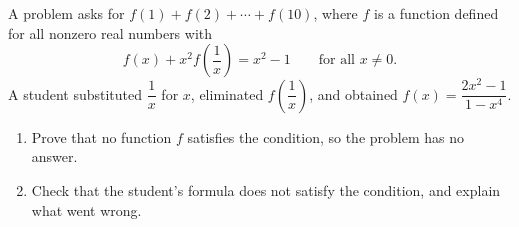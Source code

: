 A problem asks for $f(1)+f(2)+\cdots+f(10)$, where $f$ is a function defined for all nonzero real numbers with
\[
f(x)+x^2f\left(\dfrac{1}{x}\right)=x^2-1\qquad\text{for all }x\ne0 .
\]
A student substituted $\dfrac{1}{x}$ for $x$, eliminated $f\left(\dfrac{1}{x}\right)$, and obtained $f(x)=\dfrac{2x^2-1}{1-x^4}$.
\begin{enumerate}
\item[(a)] Prove that no function $f$ satisfies the condition, so the problem has no answer.
\item[(b)] Check that the student's formula does not satisfy the condition, and explain what went wrong.
\end{enumerate}
